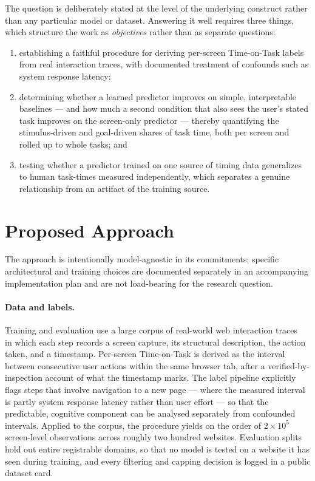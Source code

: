 \documentclass[11pt,a4paper]{article}
\begin{document}
\noindent
The question is deliberately stated at the level of the underlying construct rather than any particular model or dataset. Answering it well requires three things, which structure the work as \emph{objectives} rather than as separate questions:
\begin{enumerate}[label=(\roman*)]
  \item establishing a faithful procedure for deriving per-screen Time-on-Task labels from real interaction traces, with documented treatment of confounds such as system response latency;
  \item determining whether a learned predictor improves on simple, interpretable baselines --- and how much a second condition that also sees the user's stated task improves on the screen-only predictor --- thereby quantifying the stimulus-driven and goal-driven shares of task time, both per screen and rolled up to whole tasks; and
  \item testing whether a predictor trained on one source of timing data generalizes to human task-times measured independently, which separates a genuine relationship from an artifact of the training source.
\end{enumerate}

\section{Proposed Approach}
The approach is intentionally model-agnostic in its commitments; specific architectural and training choices are documented separately in an accompanying implementation plan and are not load-bearing for the research question.

\paragraph{Data and labels.} Training and evaluation use a large corpus of real-world web interaction traces~\cite{webchain} in which each step records a screen capture, its structural description, the action taken, and a timestamp. Per-screen Time-on-Task is derived as the interval between consecutive user actions within the same browser tab, after a verified-by-inspection account of what the timestamp marks. The label pipeline explicitly flags steps that involve navigation to a new page --- where the measured interval is partly system response latency rather than user effort --- so that the predictable, cognitive component can be analysed separately from confounded intervals. Applied to the corpus, the procedure yields on the order of $2\times10^5$ screen-level observations across roughly two hundred websites. Evaluation splits hold out entire registrable domains, so that no model is tested on a website it has seen during training, and every filtering and capping decision is logged in a public dataset card.
\end{document}
